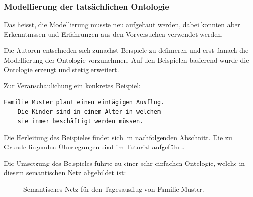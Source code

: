 \subsubsection{Modellierung der tatsächlichen Ontologie}
\label{sub:modellierung_der_ontologie_tatsaechliche}
Das heisst, die Modellierung musste neu aufgebaut werden, dabei konnten aber Erkenntnissen und Erfahrungen aus den Vorversuchen verwendet werden.

Die Autoren entschieden sich zunächst Beispiele zu definieren und erst danach die Modellierung der Ontologie vorzunehmen. Auf den Beispielen basierend wurde die Ontologie erzeugt und stetig erweitert.

Zur Veranschaulichung ein konkretes Beispiel:

\begin{lstlisting}[caption={Konkretes Beispiel einer Reiseplanung.},captionpos=b]
    Familie Muster plant einen eintägigen Ausflug.
    Die Kinder sind in einem Alter in welchem 
    sie immer beschäftigt werden müssen.
\end{lstlisting}

Die Herleitung des Beispieles findet sich im nachfolgenden Abschnitt. Die zu Grunde liegenden Überlegungen sind im Tutorial aufgeführt.

\newpage

Die Umsetzung des Beispieles führte zu einer sehr einfachen Ontologie, welche in diesem semantischen Netz abgebildet ist:
\begin{figure}[H]
    \centering {}
    \caption{Semantisches Netz für den Tagesausflug von Familie Muster.\label{fig:famMuster}\protect\footnotemark}
\end{figure}

